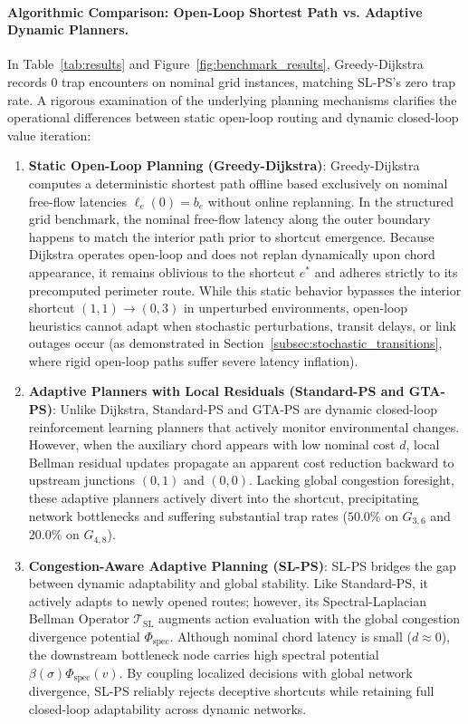 \documentclass[11pt,a4paper]{article}
\begin{document}
\paragraph{Algorithmic Comparison: Open-Loop Shortest Path vs. Adaptive Dynamic Planners.}
In Table~\ref{tab:results} and Figure~\ref{fig:benchmark_results}, Greedy-Dijkstra records $0$ trap encounters on nominal grid instances, matching SL-PS's zero trap rate. A rigorous examination of the underlying planning mechanisms clarifies the operational differences between static open-loop routing and dynamic closed-loop value iteration:
\begin{enumerate}
    \item \textbf{Static Open-Loop Planning (Greedy-Dijkstra)}: Greedy-Dijkstra computes a deterministic shortest path offline based exclusively on nominal free-flow latencies $\ell_e(0) = b_e$ without online replanning. In the structured grid benchmark, the nominal free-flow latency along the outer boundary happens to match the interior path prior to shortcut emergence. Because Dijkstra operates open-loop and does not replan dynamically upon chord appearance, it remains oblivious to the shortcut $e^*$ and adheres strictly to its precomputed perimeter route. While this static behavior bypasses the interior shortcut $(1, 1) \to (0, 3)$ in unperturbed environments, open-loop heuristics cannot adapt when stochastic perturbations, transit delays, or link outages occur (as demonstrated in Section~\ref{subsec:stochastic_transitions}, where rigid open-loop paths suffer severe latency inflation).
    \item \textbf{Adaptive Planners with Local Residuals (Standard-PS and GTA-PS)}: Unlike Dijkstra, Standard-PS and GTA-PS are dynamic closed-loop reinforcement learning planners that actively monitor environmental changes. However, when the auxiliary chord appears with low nominal cost $d$, local Bellman residual updates propagate an apparent cost reduction backward to upstream junctions $(0, 1)$ and $(0, 0)$. Lacking global congestion foresight, these adaptive planners actively divert into the shortcut, precipitating network bottlenecks and suffering substantial trap rates ($50.0\%$ on $G_{3,6}$ and $20.0\%$ on $G_{4,8}$).
    \item \textbf{Congestion-Aware Adaptive Planning (SL-PS)}: SL-PS bridges the gap between dynamic adaptability and global stability. Like Standard-PS, it actively adapts to newly opened routes; however, its Spectral-Laplacian Bellman Operator $\mathcal{T}_{\text{SL}}$ augments action evaluation with the global congestion divergence potential $\Phi_{\text{spec}}$. Although nominal chord latency is small ($d \approx 0$), the downstream bottleneck node carries high spectral potential $\beta(\sigma) \Phi_{\text{spec}}(v)$. By coupling localized decisions with global network divergence, SL-PS reliably rejects deceptive shortcuts while retaining full closed-loop adaptability across dynamic networks.
\end{enumerate}
\end{document}
